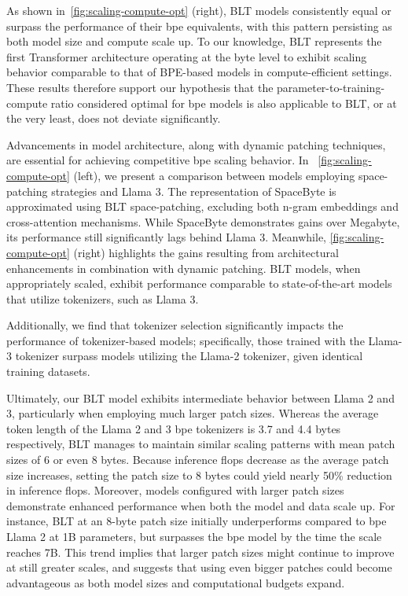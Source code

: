 As shown in~\autoref{fig:scaling-compute-opt} (right), {\textsc BLT} models consistently equal or surpass the performance of their bpe equivalents, with this pattern persisting as both model size and compute scale up. To our knowledge, {\textsc BLT} represents the first Transformer architecture operating at the byte level to exhibit scaling behavior comparable to that of BPE-based models in compute-efficient settings. These results therefore support our hypothesis that the parameter-to-training-compute ratio considered optimal for bpe models is also applicable to {\textsc BLT}, or at the very least, does not deviate significantly.

Advancements in model architecture, along with dynamic patching techniques, are essential for achieving competitive bpe scaling behavior. In ~\autoref{fig:scaling-compute-opt} (left), we present a comparison between models employing space-patching strategies and Llama 3. The representation of SpaceByte \citep{slagle2024spacebyte} is approximated using {\textsc BLT} space-patching, excluding both n-gram embeddings and cross-attention mechanisms. While SpaceByte demonstrates gains over Megabyte, its performance still significantly lags behind Llama 3. Meanwhile, \autoref{fig:scaling-compute-opt} (right) highlights the gains resulting from architectural enhancements in combination with dynamic patching. {\textsc BLT} models, when appropriately scaled, exhibit performance comparable to state-of-the-art models that utilize tokenizers, such as Llama 3.

Additionally, we find that tokenizer selection significantly impacts the performance of tokenizer-based models; specifically, those trained with the Llama-3 tokenizer surpass models utilizing the Llama-2 tokenizer, given identical training datasets.

Ultimately, our {\textsc BLT} model exhibits intermediate behavior between Llama 2 and 3, particularly when employing much larger patch sizes. Whereas the average token length of the Llama 2 and 3 bpe tokenizers is 3.7 and 4.4 bytes respectively, {\textsc BLT} manages to maintain similar scaling patterns with mean patch sizes of 6 or even 8 bytes. Because inference flops decrease as the average patch size increases, setting the patch size to 8 bytes could yield nearly 50\% reduction in inference flops. Moreover, models configured with larger patch sizes demonstrate enhanced performance when both the model and data scale up. For instance, {\textsc BLT} at an 8-byte patch size initially underperforms compared to bpe Llama 2 at 1B parameters, but surpasses the bpe model by the time the scale reaches 7B. This trend implies that larger patch sizes might continue to improve at still greater scales, and suggests that using even bigger patches could become advantageous as both model sizes and computational budgets expand.

